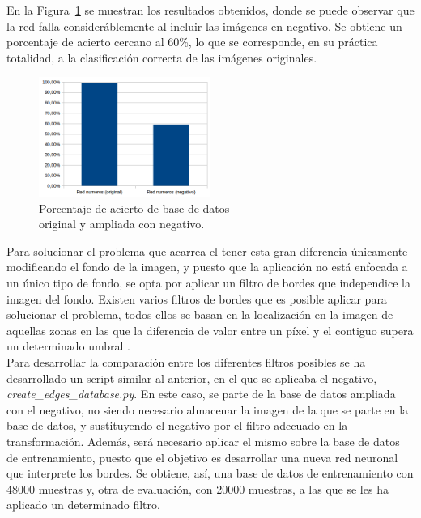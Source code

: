 En la Figura~\ref{fig.neg-orig} se muestran los resultados obtenidos, donde se puede observar que la red falla consideráblemente al incluir las imágenes en negativo. Se obtiene un porcentaje de acierto cercano al 60\%, lo que se corresponde, en su práctica totalidad, a la clasificación correcta de las imágenes originales.\\

\begin{figure}[H]
	\begin{center}
		\includegraphics[width=0.5\textwidth]{figures/orig_neg}
		\caption{Porcentaje de acierto de base de datos \\
			original y ampliada con negativo.}
		\label{fig.neg-orig}
	\end{center}
\end{figure}

Para solucionar el problema que acarrea el tener esta gran diferencia únicamente modificando el fondo de la imagen, y puesto que la aplicación no está enfocada a un único tipo de fondo, se opta por aplicar un filtro de bordes que independice la imagen del fondo. Existen varios filtros de bordes que es posible aplicar para solucionar el problema, todos ellos se basan en la localización en la imagen de aquellas zonas en las que la diferencia de valor entre un píxel y el contiguo supera un determinado umbral \cite{fundamentos}.\\

Para desarrollar la comparación entre los diferentes filtros posibles se ha desarrollado un script similar al anterior, en el que se aplicaba el negativo, \textit{create\_edges\_database.py}. En este caso, se parte de la base de datos ampliada con el negativo, no siendo necesario almacenar la imagen de la que se parte en la base de datos, y sustituyendo el negativo por el filtro adecuado en la transformación. Además, será necesario aplicar el mismo sobre la base de datos de entrenamiento, puesto que el objetivo es desarrollar una nueva red neuronal que interprete los bordes. Se obtiene, así, una base de datos de entrenamiento con 48000 muestras y, otra de evaluación, con 20000 muestras, a las que se les ha aplicado un determinado filtro.\\

